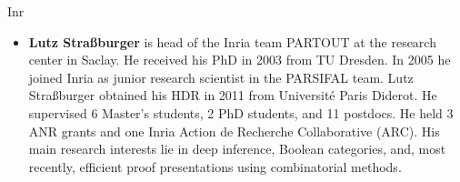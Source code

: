 \begin{sitedescription}{Inr}
\begin{itemize}
\item{\bf Lutz Straßburger} is head of the Inria team PARTOUT at the research
center in Saclay. He received his PhD in 2003 from TU Dresden.
In 2005 he joined Inria as junior research scientist in the PARSIFAL
team. Lutz Straßburger obtained his HDR in 2011 from Université Paris
Diderot.  He supervised 6 Master’s students, 2 PhD students, and 11
postdocs. He held 3 ANR grants and one Inria Action de Recherche
Collaborative (ARC).  His main research interests lie in deep
inference, Boolean categories, and, most recently, efficient proof
presentations using combinatorial methods.

\end{itemize}

\end{sitedescription}


